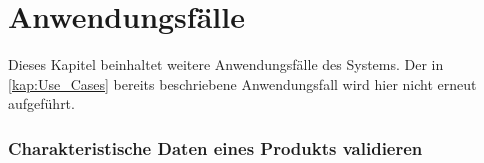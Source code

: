 \chapter{Anwendungsfälle}\label{kap:analyse_use_cases}

Dieses Kapitel beinhaltet weitere Anwendungsfälle des Systems. Der in \autoref{kap:Use_Cases} bereits beschriebene Anwendungsfall wird hier nicht erneut aufgeführt.  

\subsection{Charakteristische Daten eines Produkts validieren}

